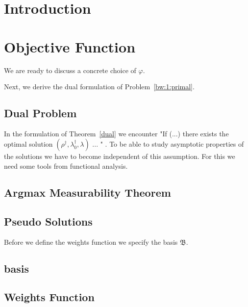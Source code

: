 \section{Introduction}


\section{Objective Function}

We are ready to discuss a concrete choice of $\varphi$.



Next, we derive the dual formulation of Problem~\ref{bw:1:primal}.
\subsection{Dual Problem}



In the formulation of Theorem~\ref{dual} we encounter "If (...) there exists the optimal solution $(\rho^\dagger,\lambda_0^\dagger,\lambda)$ ... " .
To be able to study asymptotic properties of the solutions we have to become independent of this assumption.
For this we need some tools from functional analysis.
\subsection{Argmax Measurability Theorem}


%

%
\subsection{Pseudo Solutions}


Before we define the weights function we specify the basis $\mathfrak{B}$.
\subsection{basis}

\subsection{Weights Function}


